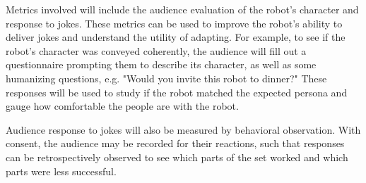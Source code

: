 \documentclass[onecolumn, draftclsnofoot,10pt, compsoc]{IEEEtran}
\begin{document}
Metrics involved will include the audience evaluation of the robot’s character and response to jokes. These metrics can be used to improve the robot's ability to deliver jokes and understand the utility of adapting. For example, to see if the robot’s character was conveyed coherently, the audience will fill out a questionnaire prompting them to describe its character, as well as some humanizing questions, e.g. "Would you invite this robot to dinner?" These responses will be used to study if the robot matched the expected persona and gauge how comfortable the people are with the robot.

Audience response to jokes will also be measured by behavioral observation. With consent, the audience may be recorded for their reactions, such that responses can be retrospectively observed to see which parts of the set worked and which parts were less successful.
\end{document}
